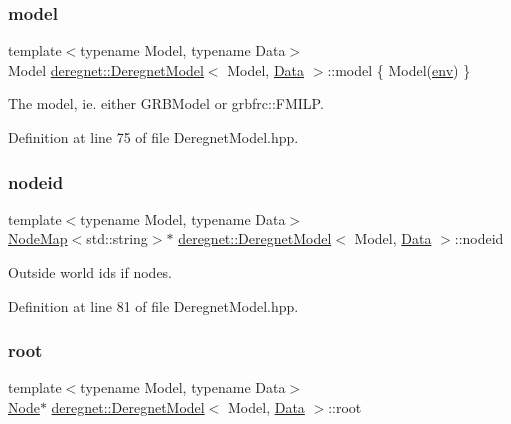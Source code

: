 \subsubsection{\texorpdfstring{model}{model}}
{\footnotesize\ttfamily template$<$typename Model, typename Data$>$ \\
Model \hyperlink{classderegnet_1_1DeregnetModel}{deregnet\+::\+Deregnet\+Model}$<$ Model, \hyperlink{avgdrgnt_8cpp_a1d1235306db276e9b36acba1db1509e8}{Data} $>$\+::model \{ Model(\hyperlink{classderegnet_1_1DeregnetModel_accd03120356b80b083041b4eef003e5b}{env}) \}\hspace{0.3cm}{\ttfamily [protected]}}



The model, ie. either G\+R\+B\+Model or grbfrc\+::\+F\+M\+I\+LP. 



Definition at line 75 of file Deregnet\+Model.\+hpp.

\mbox{\label{classderegnet_1_1DeregnetModel_adfebf6f9983c9ccc934469a79381fb78}} 
\subsubsection{\texorpdfstring{nodeid}{nodeid}}
{\footnotesize\ttfamily template$<$typename Model, typename Data$>$ \\
\hyperlink{namespacederegnet_ae102b707ae1d6f83c639ece5e0dd5658}{Node\+Map}$<$std\+::string$>$$\ast$ \hyperlink{classderegnet_1_1DeregnetModel}{deregnet\+::\+Deregnet\+Model}$<$ Model, \hyperlink{avgdrgnt_8cpp_a1d1235306db276e9b36acba1db1509e8}{Data} $>$\+::nodeid\hspace{0.3cm}{\ttfamily [protected]}}



Outside world ids if nodes. 



Definition at line 81 of file Deregnet\+Model.\+hpp.

\mbox{\label{classderegnet_1_1DeregnetModel_a54b20393a0e26d65935d387685d7fe96}} 
\subsubsection{\texorpdfstring{root}{root}}
{\footnotesize\ttfamily template$<$typename Model, typename Data$>$ \\
\hyperlink{namespacederegnet_a744bad34f2de9856d36715a445f027f3}{Node}$\ast$ \hyperlink{classderegnet_1_1DeregnetModel}{deregnet\+::\+Deregnet\+Model}$<$ Model, \hyperlink{avgdrgnt_8cpp_a1d1235306db276e9b36acba1db1509e8}{Data} $>$\+::root\hspace{0.3cm}{\ttfamily [protected]}}



